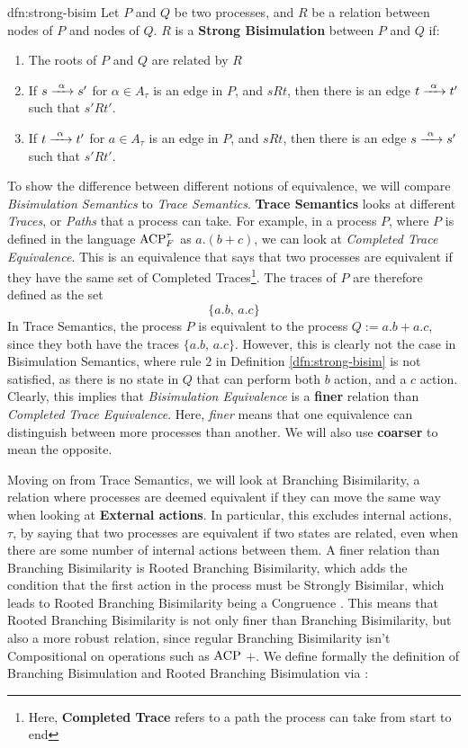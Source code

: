 \documentclass[../hons_project.tex]{subfiles}
\begin{document}
\begin{dfn}{dfn:strong-bisim}{}
   Let $P$ and $Q$ be two processes, and $R$ be a relation between nodes of $P$ and nodes of $Q$. $R$ is a \textbf{Strong Bisimulation} between $P$ and $Q$ if:
   \begin{enumerate}
      \item The roots of $P$ and $Q$ are related by $R$
      \item If $s \prightarrow{\alpha} s'$ for $\alpha\in A_{\tau}$ is an edge in $P$, and $s R t$, then there is an edge $t \prightarrow{\alpha} t'$ such that $s' R t'$.
      \item If $t \prightarrow{\alpha} t'$ for $a\in A_{\tau}$ is an edge in $P$, and $s R t$, then there is an edge $s \prightarrow{\alpha} s'$ such that $s' R t'$.
   \end{enumerate}
\end{dfn}

To show the difference between different notions of equivalence, we will compare \textit{Bisimulation Semantics} to \textit{Trace Semantics}. \textbf{Trace Semantics} looks at different \textit{Traces}, or \textit{Paths} that a process can take. For example, in a process $P$, where $P$ is defined in the language $\mathrm{ACP}_{F}^{\tau}$ as $a . (b + c)$, we can look at \textit{Completed Trace Equivalence}. This is an equivalence that says that two processes are equivalent if they have the same set of Completed Traces\footnote{Here, \textbf{Completed Trace} refers to a path the process can take from start to end}. The traces of $P$ are therefore defined as the set
\[\{a . b,\,a . c\}\]
In Trace Semantics, the process $P$ is equivalent to the process $Q := a . b + a . c$, since they both have the traces $\{a . b,\,a . c\}$. However, this is clearly not the case in Bisimulation Semantics, where rule $2$ in Definition \ref{dfn:strong-bisim} is not satisfied, as there is no state in $Q$ that can perform both $b$ action, and a $c$ action. Clearly, this implies that \textit{Bisimulation Equivalence} is a \textbf{finer} relation than \textit{Completed Trace Equivalence}. Here, \textit{finer} means that one equivalence can distinguish between more processes than another. We will also use \textbf{coarser} to mean the opposite.

Moving on from Trace Semantics, we will look at Branching Bisimilarity, a relation where processes are deemed equivalent if they can move the same way when looking at \textbf{External actions}. In particular, this excludes internal actions, $\tau$, by saying that two processes are equivalent if two states are related, even when there are some number of internal actions between them. A finer relation than Branching Bisimilarity is Rooted Branching Bisimilarity, which adds the condition that the first action in the process must be Strongly Bisimilar, which leads to Rooted Branching Bisimilarity being a Congruence \citep{fokkinkRootedBranchingBisimulation2000}. This means that Rooted Branching Bisimilarity is not only finer than Branching Bisimilarity, but also a more robust relation, since regular Branching Bisimilarity isn't Compositional on operations such as $\mathrm{ACP}$ $+$. We define formally the definition of Branching Bisimulation and Rooted Branching Bisimulation via \cite{baetenProcessAlgebra1990}:
\end{document}
